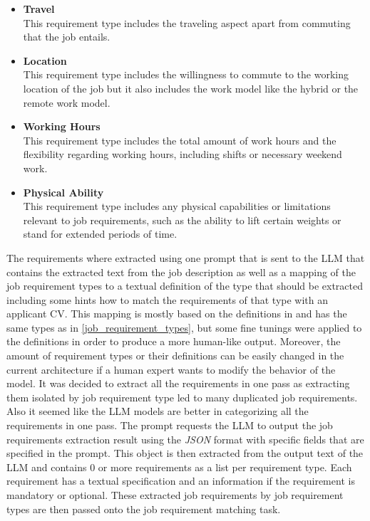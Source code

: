 \documentclass[draft,final]{thesisclass} %
\begin{document}
\begin{itemize}
    \item \textbf{Travel}\\
    This requirement type includes the traveling aspect apart from commuting that the job entails.
    \item \textbf{Location}\\
    This requirement type includes the willingness to commute to the working location of the job but it also includes the work model like the hybrid or the remote work model.
    \item \textbf{Working Hours}\\
    This requirement type includes the total amount of work hours and the flexibility regarding working hours, including shifts or necessary weekend work.
    \item \textbf{Physical Ability}\\
    This requirement type includes any physical capabilities or limitations relevant to job requirements, such as the ability to lift certain weights or stand for extended periods of time.
\end{itemize}
The requirements where extracted using one prompt that is sent to the \acs{LLM} that contains the extracted text from the job description as well as a mapping of the job requirement types to a textual definition of the type that should be extracted including some hints how to match the requirements of that type with an applicant \acs{CV}.
This mapping is mostly based on the definitions in \textcite{job_requirement_types} and has the same types as in \ref{job_requirement_types}, but some fine tunings were applied to the definitions in order to produce a more human-like output.
Moreover, the amount of requirement types or their definitions can be easily changed in the current architecture if a human expert wants to modify the behavior of the model.
It was decided to extract all the requirements in one pass as extracting them isolated by job requirement type led to many duplicated job requirements.
Also it seemed like the \acs{LLM} models are better in categorizing all the requirements in one pass.
The prompt requests the \acs{LLM} to output the job requirements extraction result using the \textit{JSON} format with specific fields that are specified in the prompt.
This  object is then extracted from the output text of the \acs{LLM} and contains $0$ or more requirements as a list per requirement type.
Each requirement has a textual specification and an information if the requirement is mandatory or optional.
These extracted job requirements by job requirement types are then passed onto the job requirement matching task.
\end{document}
